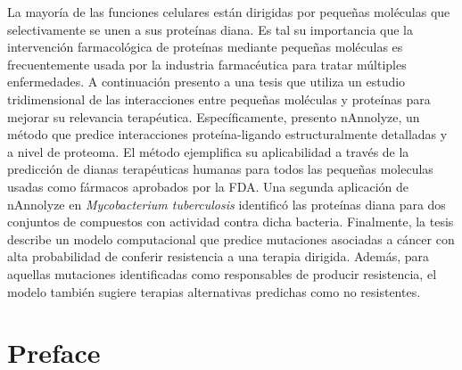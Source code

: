 \documentclass[11pt, b5paper,twoside]{tesi_upf}
\begin{document}
La mayoría de las funciones celulares están dirigidas por pequeñas moléculas que selectivamente se unen a sus proteínas diana. Es tal su importancia que la intervención farmacológica de proteínas mediante pequeñas moléculas es frecuentemente usada por la industria farmacéutica para tratar múltiples enfermedades. A continuación presento a una tesis que utiliza un estudio tridimensional de las interacciones entre pequeñas moléculas y proteínas para mejorar su relevancia terapéutica. Específicamente, presento nAnnolyze, un método que predice interacciones proteína-ligando estructuralmente detalladas y a nivel de proteoma. El método ejemplifica su aplicabilidad a través de la predicción de dianas terapéuticas humanas para todos las pequeñas moleculas usadas como fármacos aprobados por la FDA. Una segunda aplicación de nAnnolyze en \textit{Mycobacterium tuberculosis} identificó las proteínas diana para dos conjuntos de compuestos con actividad contra dicha bacteria. Finalmente, la tesis describe un modelo computacional que predice mutaciones asociadas a cáncer con alta probabilidad de conferir resistencia a una terapia dirigida. Además, para aquellas mutaciones identificadas como responsables de producir resistencia, el modelo también sugiere terapias alternativas predichas como no resistentes. 





\vspace*{\fill}

\clearpage
\section*{Preface}

\end{document}

